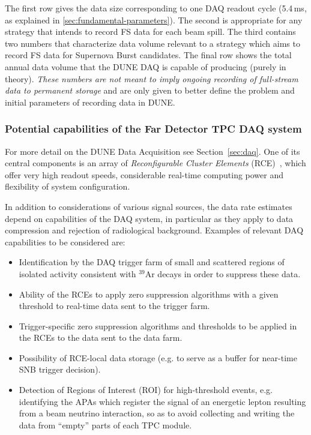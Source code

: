The first row gives the data size corresponding to one DAQ readout cycle (5.4\,ms, as explained in \ref{sec:fundamental-parameters}).
The second is appropriate for any strategy that intends to record FS data for each beam spill.
The third contains two numbers that characterize data volume relevant to a strategy which aims
to record FS data for Supernova Burst candidates. The final row  shows the total annual data
volume that the DUNE DAQ is capable of producing (purely in theory).
\textit{These numbers are not meant to imply ongoing recording of full-stream
data to permanent storage} and are only given to better define the problem and initial parameters
of recording data in DUNE.


\subsubsection{Potential capabilities of the Far Detector TPC DAQ system}
\label{sec:daq-assumptions}
For more detail on the DUNE Data Acquisition see Section~\ref{sec:daq}. One of its central components
is an array of \textit{Reconfigurable Cluster Elements} (RCE)~\cite{slac_rce_1}, which offer very high
readout speeds, considerable real-time computing power and flexibility of system configuration.

In addition to considerations of various signal sources, the data rate estimates depend on capabilities of the DAQ system,
in particular as they apply to data compression and rejection of radiological background.
Examples of relevant DAQ capabilities to be considered are:

\begin{itemize}

\item Identification by the DAQ trigger farm of small and scattered regions of isolated activity
  consistent with $^{39}$Ar decays in order to suppress these data.

\item Ability of the RCEs to apply zero suppression algorithms
with a given threshold to real-time data sent to the trigger farm.

\item Trigger-specific zero suppression algorithms and thresholds to be applied
in the RCEs to the data sent to the data farm.

\item Possibility of RCE-local data storage (e.g. to serve as a buffer for near-time SNB trigger decision).

\item Detection of Regions of Interest (ROI) for high-threshold events, e.g. identifying the APAs
which register the signal of an energetic lepton resulting from a beam neutrino interaction, so as
to avoid collecting and writing the data from ``empty'' parts of each TPC module.

\end{itemize}


